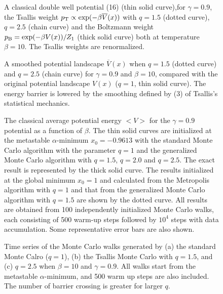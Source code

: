 \begin{figure}[th]
\epsfxsize=8cm \centerline{}
\caption{A classical double well 
potential (16) (thin solid curve),for $\gamma=0.9$, the Tsallis weight 
$p_{\rm T} \propto \exp(-\beta \overline{V}(x))$ with $q=1.5$ 
(dotted curve), $q=2.5$ (chain curve) and the Boltzmann 
weight $p_{\rm B}=\exp(-\beta V(x))/Z_{1}$ (thick solid curve) 
both at temperature $\beta=10$.  The Tsallis weights are 
renormalized.}
\label{fig:1}
\end{figure}

\begin{figure}[th]
\epsfxsize=8cm \centerline{}
\caption{A smoothed potential landscape $\overline{V}(x)$ 
when $q=1.5$ (dotted curve) and $q=2.5$ (chain curve) for 
$\gamma=0.9$ and $\beta=10$, compared with the original 
potential landscape $V(x)$ ($q=1$, thin solid curve). 
The energy barrier is lowered by the smoothing defined 
by (3) of Tsallis's statistical mechanics.}
\label{fig:2}
\end{figure}

\begin{figure}[th]
\epsfxsize=8cm \centerline{}
\caption{The classical average potential energy $<V>$ for 
the $\gamma=0.9$ potential as a function of $\beta$. The 
thin solid curves are initialized at the 
metastable $\alpha$-minimum $x_{0}=-0.9613$ 
with the standard Monte Carlo 
algorithm with the parameter $q=1$ and the generalized Monte 
Carlo algorithm with $q=1.5$, $q=2.0$ and $q=2.5$. 
The exact result is represented by the thick solid 
curve.  The results initialized at the global minimum $x_{0}=1$ 
and calculated from the Metropolis algorithm with $q=1$ and that from 
the generalized Monte Carlo algorithm with $q=1.5$ are shown 
by the dotted curve. All results are obtained from 100 independently 
initialized Monte Carlo walks, each consisting of 500 warm-up steps 
followed by $10^{4}$ steps with data accumulation.  Some 
representative error bars are 
also shown.}
\label{fig:3}
\end{figure}

\begin{figure}[th]
\epsfxsize=8cm \centerline{}
\vspace{4mm}
\epsfxsize=8cm \centerline{}
\vspace{4mm}
\epsfxsize=8cm \centerline{}
\caption{ Time series of the Monte Carlo walks generated by 
(a) the standard Monte Calro ($q=1$), (b) the Tsallis Monte 
Carlo with $q=1.5$, and (c) $q=2.5$ when $\beta=10$ and 
$\gamma=0.9$.  All walks start from the metastable 
$\alpha$-minimum, and 500 warm up steps are also included.  
The number of barrier crossing is greater
for larger $q$.} 
\label{fig:4}
\end{figure}

